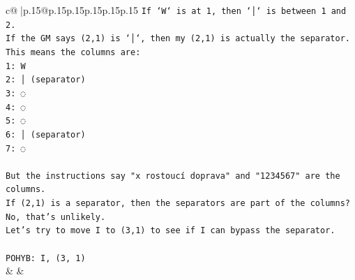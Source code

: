 \documentclass{article}
\begin{document}
{\begin{supertabular}{c@{$\;$}|p{.15\linewidth}@{}p{.15\linewidth}p{.15\linewidth}p{.15\linewidth}p{.15\linewidth}p{.15\linewidth}}
{{{\texttt{If `W` is at 1, then `│` is between 1 and 2.} \\
\texttt{If the GM says (2,1) is `│`, then my (2,1) is actually the separator.} \\
\texttt{This means the columns are:} \\
\texttt{1: W} \\
\texttt{2: │ (separator)} \\
\texttt{3: ◌} \\
\texttt{4: ◌} \\
\texttt{5: ◌} \\
\texttt{6: │ (separator)} \\
\texttt{7: ◌} \\
\\ 
\texttt{But the instructions say "x rostoucí doprava" and "1234567" are the columns.} \\
\texttt{If (2,1) is a separator, then the separators are part of the columns? No, that's unlikely.} \\
\texttt{Let's try to move I to (3,1) to see if I can bypass the separator.} \\
\\ 
\texttt{POHYB: I, (3, 1)} \\
            }
        }
    }
    & & \\ \\


\end{supertabular}}
\end{document}
